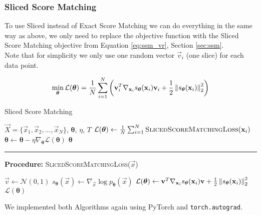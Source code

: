 \subsubsection{Sliced Score Matching}
\label{sec:gmm_ssm}

To use Sliced instead of Exact Score Matching we can do everything in the same way as above, we only need to replace 
the objective function with the Sliced Score Matching objective from Equation \ref{eq:ssm_vr}, Section \ref{sec:ssm}. \\
Note that for simplicity we only use one random vector $\vec v_i$ (one slice) for each data point. 

\begin{equation}
    \min_{\substack{\boldsymbol{\theta}}} \mathcal{L}(\boldsymbol{\theta}) = \frac{1}{N} \sum_{i=1}^{N} \left( \vec{v}_i^T \nabla_{\vec x_i} s_{\boldsymbol{\theta}}(\vec x_i) \vec{v}_i + \frac{1}{2} \norm{  s_{\boldsymbol{\theta}}(\vec x_i) }^2_2 \right)
    \label{eq:ssm_optimization_problem}
\end{equation}

\begin{algorithm}[H]
    \caption{Sliced Score Matching}
    \begin{algorithmic}[1]  
        \Require $\vec X = \{\vec x_1, \vec x_2, ..., \vec x_N\}$, $\boldsymbol{\theta}$, $\eta$, $T$
            \State $\mathcal{L}(\boldsymbol{\theta}) \gets \frac{1}{N} \sum_{i=1}^N \textsc{SlicedScoreMatchingLoss}(\vec x_i)$
            \State $\boldsymbol{\theta} \gets \boldsymbol{\theta} - \eta \nabla_{\boldsymbol{\theta}} \mathcal{L}(\boldsymbol{\theta})$
        \EndFor
        \State \Return $\boldsymbol{\theta}$
        \end{algorithmic}
        \noindent\rule{\linewidth}{0.4pt} 
        \textbf{Procedure:} \textsc{SlicedScoreMatchingLoss}($\vec x$)
        \begin{algorithmic}[1]
            \State $\vec v \gets \mathcal{N}(0, 1)$
            \State $s_{\boldsymbol{\theta}}(\vec x) \gets \nabla_{\vec x} \log p_{\boldsymbol{\theta}}(\vec x)$
            \State $\mathcal{L}(\boldsymbol{\theta}) \gets \vec{v}^T \nabla_{\vec x_i} s_{\boldsymbol{\theta}}(\vec x_i) \vec{v} + \frac{1}{2} \norm{  s_{\boldsymbol{\theta}}(\vec x_i) }^2_2$
            \State \Return $\mathcal{L}(\boldsymbol{\theta})$
        \end{algorithmic}
\end{algorithm}

We implemented both Algorithms again using PyTorch \cite{pytorch} and \texttt{torch.autograd}. 

